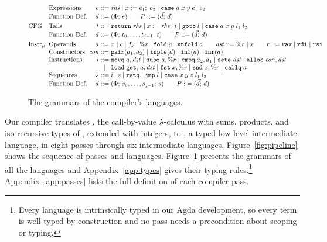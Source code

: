 \begin{figure}[t]
\[\begin{array}{@{}l@{\;\;}l@{\;}r@{\;}c@{\;}l@{}}
 & \text{Expressions} & e & ::= & \rhs \mid x \mathrel{:=} e_1;\; e_2 \mid \kw{case}\;a\;x\;y\;e_1\;e_2\\
 & \text{Function Def.} & d & ::= & (\Phi;\, e)
  \qquad P ::= (\vec{d};\, d)\\[3pt]
\text{CFG} & \text{Tails} & t & ::= & \kw{return}\;\rhs \mid x \mathrel{:=} \rhs;\; t \mid \kw{goto}\;l
  \mid \kw{case}\;a\;x\;y\;l_1\;l_2\\
 & \text{Function Def.} & d & ::= & (\Phi;\, t_0, \ldots, t_{j-1};\, t)
  \qquad P ::= (\vec{d};\, d)\\[3pt]
\instr & \text{Operands} & a & ::= & x \mid c \mid f_k \mid \%r \mid \kw{fold}\;a \mid \kw{unfold}\;a
  \qquad \mathit{dst} ::= \%r \mid x
  \qquad r ::= \kw{rax} \mid \kw{rdi} \mid \kw{rsi}\\
 & \text{Constructors} & \mathit{con} & ::= & \kw{pair}(a_1, a_2) \mid \kw{tuple}(\vec{a}) \mid \kw{inl}(a) \mid \kw{inr}(a)\\
 & \text{Instructions} & i & ::= & \kw{movq}\;a, \mathit{dst} \mid \kw{subq}\;a, \%r \mid \kw{cmpq}\;a_2, a_1
  \mid \kw{sete}\;\mathit{dst} \mid \kw{alloc}\;\mathit{con}, \mathit{dst}\\
 & & & \mid & \kw{load}\;\kw{get}_i\;a, \mathit{dst} \mid \kw{fst}\;x, \%r \mid \kw{snd}\;x, \%r \mid \kw{callq}\;a\\
 & \text{Sequences} & s & ::= & i;\; s \mid \kw{retq} \mid \kw{jmp}\;l \mid \kw{case}\;x\;y\;z\;l_1\;l_2\\
 & \text{Function Def.} & d & ::= & (\Phi;\, s_0, \ldots, s_{j-1};\, s)
  \qquad P ::= (\vec{d};\, d)
\end{array}
\]
\caption{The grammars of the compiler's languages.}
\label{fig:grammars}
\end{figure}

Our compiler translates \fpc, the call-by-value $\lambda$-calculus
with sums, products, and iso-recursive types of
\citet{Plotkin:1985aa}, extended with integers, to \instr, a typed
low-level intermediate language, in eight passes through six
intermediate languages. Figure~\ref{fig:pipeline} shows the sequence
of passes and languages.  Figure~\ref{fig:grammars} presents the
grammars of all the languages and Appendix~\ref{app:types} gives their
typing rules.\footnote{Every language is intrinsically typed in our
Agda development, so every term is well typed by construction and no
pass needs a precondition about scoping or typing.}
Appendix~\ref{app:passes} lists the full definition of each compiler
pass.

